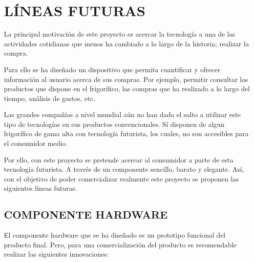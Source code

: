 \chapter{LÍNEAS FUTURAS}

La principal motivación de este proyecto es acercar la tecnología a una de las actividades cotidianas que menos ha cambiado a lo largo de la historia; realizar la compra.

Para ello se ha diseñado un dispositivo que permita cuantificar y ofrecer información al usuario acerca de sus compras. Por ejemplo, permitir consultar los productos que dispone en el frigorífico, las compras que ha realizado a lo largo del tiempo, análisis de gastos, etc.

Las grandes compañías a nivel mundial aún no han dado el salto a utilizar este tipo de tecnologías en sus productos convencionales. Sí disponen de algun frigorífico de gama alta con tecnología futurista, los cuales, no son accesibles para el consumidor medio.

Por ello, con este proyecto se pretende acercar al consumidor a parte de esta tecnología futurista. A través de un componente sencillo, barato y elegante. Así, con el objetivo de poder comercializar realmente este proyecto se proponen las siguientes líneas futuras.

\section{COMPONENTE HARDWARE}

El componente hardware que se ha diseñado es un prototipo funcional del producto final. Pero, para una comercialización del producto es recomendable realizar las siguientes innovaciones:

